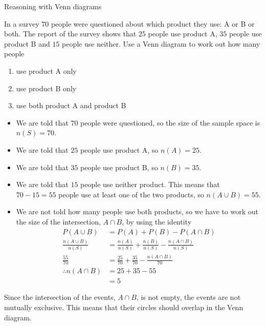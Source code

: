 \begin{wex}{Reasoning with Venn diagrams}
{
\begin{minipage}{\textwidth}
In a survey $70$ people were questioned about which product they
  use: A or B or both. The report of the survey shows that $25$
  people use product A, $35$ people use product B and $15$ people use
  neither. Use a Venn diagram to work out how many people
  \begin{enumerate}[itemsep=5pt, label=\textbf{\arabic*}. ]
  \item use product A only
  \item use product B only
  \item use both product A and product B
  \end{enumerate}
\end{minipage}
}{

  \begin{itemize}
  \item We are told that $70$ people were questioned, so the size of the
    sample space is $n(S) = 70$.
  \item We are told that $25$ people use product A, so $n(A) = 25$.
  \item We are told that $35$ people use product B, so $n(B) = 35$.
  \item We are told that $15$ people use neither product. This means
    that $70-15=55$ people use at least one of the two products, so
    $n(A \cup B) = 55$.
  \item We are not told how many people use both products, so we have
    to work out the size of the intersection, $A \cap B$, by using the
    identity
    \begin{align*}
      P(A \cup B) &= P(A) + P(B) - P(A \cap B) \\
      \frac{n(A \cup B)}{n(S)} &= \frac{n(A)}{n(S)} + \frac{n(B)}{n(S)} - \frac{n(A \cap B)}{n(S)} \\
      \frac{55}{70} &= \frac{25}{70} + \frac{35}{70} - \frac{n(A \cap B)}{70} \\
      \therefore n(A \cap B) &= 25 + 35 - 55 \\
      &= 5
    \end{align*}
  \end{itemize}
  Since the intersection of the events, $A \cap B$, is not empty, the
  events are not mutually exclusive. This means that their circles
  should overlap in the Venn diagram.

}
\end{wex}
